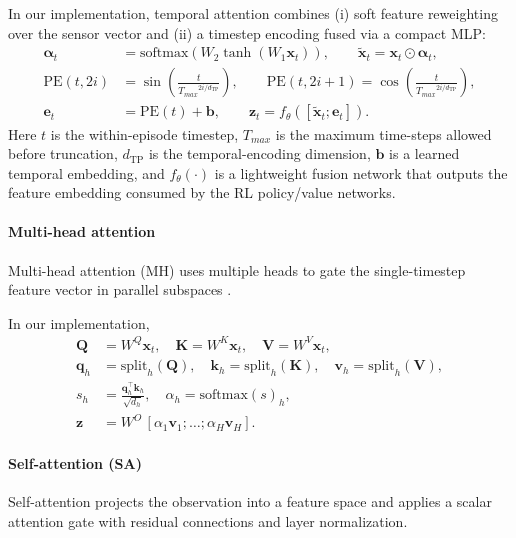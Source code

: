 \documentclass[sn-basic]{sn-jnl} %
\begin{document}
In our implementation, temporal attention combines (i) soft feature reweighting over the sensor vector and (ii) a timestep encoding fused via a compact MLP:
\begin{align}
	\boldsymbol{\alpha}_t &= \mathrm{softmax}\!\left(W_2\tanh\!\left(W_1\mathbf{x}_t\right)\right),
	\qquad \tilde{\mathbf{x}}_t = \mathbf{x}_t\odot\boldsymbol{\alpha}_t,\\
	\mathrm{PE}(t,2i) &= \sin\!\left(\frac{t}{{T_{max}}^{2i/d_{\mathrm{TP}}}}\right),
	\qquad \mathrm{PE}(t,2i+1)=\cos\!\left(\frac{t}{{T_{max}}^{2i/d_{\mathrm{TP}}}}\right),\\
	\mathbf{e}_t &= \mathrm{PE}(t) + \mathbf{b},
	\qquad \mathbf{z}_t = f_\theta\!\left([\tilde{\mathbf{x}}_t;\mathbf{e}_t]\right).
\end{align}
Here $t$ is the within-episode timestep, $T_{max}$ is the maximum time-steps allowed before truncation, $d_{\mathrm{TP}}$ is the temporal-encoding dimension, $\mathbf{b}$ is a learned temporal embedding, and $f_\theta(\cdot)$ is a lightweight fusion network that outputs the feature embedding consumed by the RL policy/value networks.

\paragraph{Multi-head attention}
Multi-head attention (MH) uses multiple heads to gate the single-timestep feature vector in parallel subspaces \cite{Vaswani2017}.

In our implementation,
\begin{align}
	\mathbf{Q}&=W^Q\mathbf{x}_t,\quad \mathbf{K}=W^K\mathbf{x}_t,\quad \mathbf{V}=W^V\mathbf{x}_t,\\
	\mathbf{q}_h&=\mathrm{split}_h(\mathbf{Q}),\quad \mathbf{k}_h=\mathrm{split}_h(\mathbf{K}),\quad \mathbf{v}_h=\mathrm{split}_h(\mathbf{V}),\\
	s_h&=\frac{\mathbf{q}_h^\top\mathbf{k}_h}{\sqrt{d_h}},\quad \alpha_h=\mathrm{softmax}(s)_h,\\
	\mathbf{z}&=W^O\,[\alpha_1\mathbf{v}_1;\ldots;\alpha_H\mathbf{v}_H].
\end{align}

\paragraph{Self-attention (SA)}
Self-attention projects the observation into a feature space and applies a scalar attention gate with residual connections and layer normalization.
\end{document}
